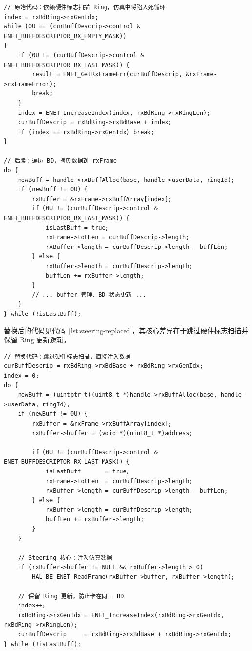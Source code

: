\begin{lstlisting}[style=CStyle,abovecaptionskip=0pt,belowcaptionskip=0pt,caption=Steering 策略原始代码示例（NXP ENET\_GetRxFrame）,label=lst:steering-original]
// 原始代码：依赖硬件标志扫描 Ring，仿真中将陷入死循环
index = rxBdRing->rxGenIdx;
while (0U == (curBuffDescrip->control & ENET_BUFFDESCRIPTOR_RX_EMPTY_MASK))
{
    if (0U != (curBuffDescrip->control & ENET_BUFFDESCRIPTOR_RX_LAST_MASK)) {
        result = ENET_GetRxFrameErr(curBuffDescrip, &rxFrame->rxFrameError);
        break;
    }
    index = ENET_IncreaseIndex(index, rxBdRing->rxRingLen);
    curBuffDescrip = rxBdRing->rxBdBase + index;
    if (index == rxBdRing->rxGenIdx) break;
}

// 后续：遍历 BD，拷贝数据到 rxFrame
do {
    newBuff = handle->rxBuffAlloc(base, handle->userData, ringId);
    if (newBuff != 0U) {
        rxBuffer = &rxFrame->rxBuffArray[index];
        if (0U != (curBuffDescrip->control & ENET_BUFFDESCRIPTOR_RX_LAST_MASK)) {
            isLastBuff = true;
            rxFrame->totLen = curBuffDescrip->length;
            rxBuffer->length = curBuffDescrip->length - buffLen;
        } else {
            rxBuffer->length = curBuffDescrip->length;
            buffLen += rxBuffer->length;
        }
        // ... buffer 管理、BD 状态更新 ...
    }
} while (!isLastBuff);
\end{lstlisting}
替换后的代码见代码~\ref{lst:steering-replaced}，其核心差异在于跳过硬件标志扫描并保留 Ring 更新逻辑。
\begin{lstlisting}[style=CStyle,abovecaptionskip=0pt,belowcaptionskip=0pt,caption=Steering 策略替换代码示例（NXP ENET\_GetRxFrame）,label=lst:steering-replaced]
// 替换代码：跳过硬件标志扫描，直接注入数据
curBuffDescrip = rxBdRing->rxBdBase + rxBdRing->rxGenIdx;
index = 0;
do {
    newBuff = (uintptr_t)(uint8_t *)handle->rxBuffAlloc(base, handle->userData, ringId);
    if (newBuff != 0U) {
        rxBuffer = &rxFrame->rxBuffArray[index];
        rxBuffer->buffer = (void *)(uint8_t *)address;

        if (0U != (curBuffDescrip->control & ENET_BUFFDESCRIPTOR_RX_LAST_MASK)) {
            isLastBuff       = true;
            rxFrame->totLen  = curBuffDescrip->length;
            rxBuffer->length = curBuffDescrip->length - buffLen;
        } else {
            rxBuffer->length = curBuffDescrip->length;
            buffLen += rxBuffer->length;
        }
    }

    // Steering 核心：注入仿真数据
    if (rxBuffer->buffer != NULL && rxBuffer->length > 0)
        HAL_BE_ENET_ReadFrame(rxBuffer->buffer, rxBuffer->length);

    // 保留 Ring 更新，防止卡在同一 BD
    index++;
    rxBdRing->rxGenIdx = ENET_IncreaseIndex(rxBdRing->rxGenIdx, rxBdRing->rxRingLen);
    curBuffDescrip     = rxBdRing->rxBdBase + rxBdRing->rxGenIdx;
} while (!isLastBuff);
\end{lstlisting}

